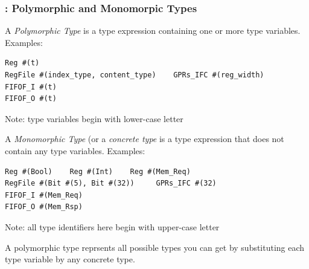 \begin{frame}[fragile]
\frametitle{{\BSV}: Polymorphic and Monomorpic Types}

\footnotesize

A \emph{Polymorphic Type} is a type expression containing one or more
type variables. Examples:

\vspace{1ex}

\begin{center}
 \begin{minipage}{0.6\textwidth}
  \begin{Verbatim}[frame=single]
Reg #(t)
RegFile #(index_type, content_type)    GPRs_IFC #(reg_width)
FIFOF_I #(t)
FIFOF_O #(t)
  \end{Verbatim}
 \end{minipage}
 \begin{minipage}{0.35\textwidth}
  Note: type variables begin with lower-case letter
 \end{minipage}
\end{center}

\vspace{1ex}

A \emph{Monomorphic Type} (or a \emph{concrete type} is a type
expression that does not contain any type variables.  Examples:

\vspace{1ex}

\begin{center}
 \begin{minipage}{0.6\textwidth}
  \begin{Verbatim}[frame=single]
Reg #(Bool)    Reg #(Int)    Reg #(Mem_Req)
RegFile #(Bit #(5), Bit #(32))     GPRs_IFC #(32)
FIFOF_I #(Mem_Req)
FIFOF_O #(Mem_Rsp)
  \end{Verbatim}
 \end{minipage}
 \begin{minipage}{0.35\textwidth}
  Note: all type identifiers here begin with upper-case letter
 \end{minipage}
\end{center}

\vspace{1ex}

A polymorphic type reprsents all possible types you can get by
substituting each type variable by any concrete type.

\end{frame}


